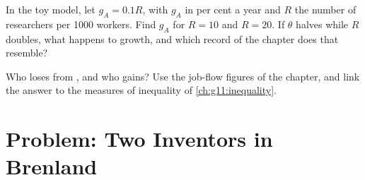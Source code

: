\begin{exercise}[$\star\star\star$]\label{exo:g12:ideas-institutions-growth:14}
In the toy model, let $g_A = 0.1R$, with $g_A$ in per cent a year and $R$ the number of researchers per 1000 workers. Find $g_A$ for $R = 10$ and $R = 20$. If $\theta$
halves while $R$ doubles, what happens to growth, and which record of the chapter does that resemble?
\end{exercise}

\begin{exercise}[$\star\star\star$]\label{exo:g12:ideas-institutions-growth:15}
Who loses from , and who gains? Use the job-flow figures of the chapter, and link the answer to the measures of inequality of \cref{ch:g11:inequality}.
\end{exercise}

\section{Problem: Two Inventors in Brenland}

